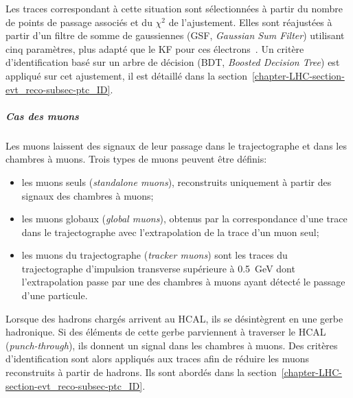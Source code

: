 Les traces correspondant à cette situation sont sélectionnées à partir du nombre de points de passage associés et du $\chi^2$ de l'ajustement.
Elles sont réajustées à partir d'un filtre de somme de gaussiennes (GSF, \emph{Gaussian Sum Filter}) \cite{GSF} utilisant cinq paramètres, plus adapté que le KF pour ces électrons~\cite{particle-flow}.
Un critère d'identification basé sur un arbre de décision (BDT, \emph{Boosted Decision Tree}) est appliqué sur cet ajustement, il est détaillé dans la section~\ref{chapter-LHC-section-evt_reco-subsec-ptc_ID}.
\subparagraph{Cas des muons}
Les muons laissent des signaux de leur passage dans le trajectographe et dans les chambres à muons.
Trois types de muons peuvent être définis:
\begin{itemize}
\item les muons seuls (\emph{standalone muons}), reconstruits uniquement à partir des signaux des chambres à muons;
\item les muons globaux (\emph{global muons}), obtenus par la correspondance d'une trace dans le trajectographe avec l'extrapolation de la trace d'un muon seul;
\item les muons du trajectographe (\emph{tracker muons}) sont les traces du trajectographe d'impulsion transverse supérieure à \SI{0.5}{\GeV} dont l'extrapolation passe par une des chambres à muons ayant détecté le passage d'une particule.
\end{itemize}
\par
Lorsque des hadrons chargés arrivent au HCAL, ils se désintègrent en une gerbe hadronique.
Si des éléments de cette gerbe parviennent à traverser le HCAL (\emph{punch-through}), ils donnent un signal dans les chambres à muons.
Des critères d'identification sont alors appliqués aux traces afin de réduire les muons reconstruits à partir de hadrons.
Ils sont abordés dans la section~\ref{chapter-LHC-section-evt_reco-subsec-ptc_ID}.

